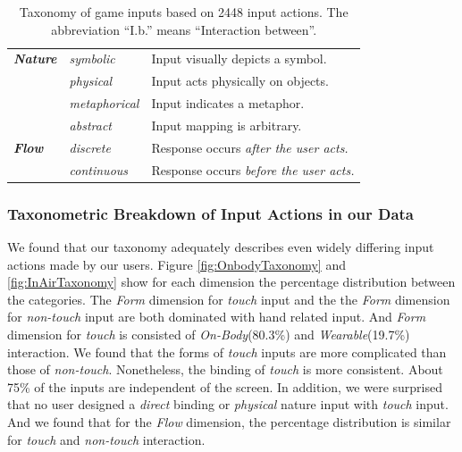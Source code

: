 \documentclass{sigchi}
\begin{document}
\begin{table}
\begin{adjustwidth}{-0.5cm}{}
\begin{tabular}{|l|l|l|}
        \textbf{\em{Nature}} & \em{symbolic} & Input visually depicts a symbol.\\ \cline{2-3} 
             & \em{physical} & Input acts physically on objects.\\ \cline{2-3} 
             & \em{metaphorical} & Input indicates a metaphor.\\ \cline{2-3} 
             & \em{abstract} & Input mapping is arbitrary.\\
      \Xhline{4\arrayrulewidth}
        \textbf{\em{Flow}} & \em{discrete} & Response occurs \em{after} the user acts.\\ \cline{2-3} 
             & \em{continuous} & Response occurs \em{before} the user acts.\\
      \hline
    \end{tabular}
    \caption{Taxonomy of game inputs based on 2448 input actions. The abbreviation ``I.b.'' means ``Interaction between''.}
    \label{tab:taxonomy}
    \end{adjustwidth}
  \end{table}
 

 \subsubsection{Taxonometric Breakdown of Input Actions in our Data}
We found that our taxonomy adequately describes even widely differing input actions made by our users. Figure \ref{fig:OnbodyTaxonomy} and \ref{fig:InAirTaxonomy} show for each dimension the percentage distribution between the categories. The \emph{Form} dimension for \emph{touch} input and the the \emph{Form} dimension for \emph{non-touch} input are both dominated with hand related input. And \emph{Form} dimension for \emph{touch} is consisted of \emph{On-Body}(80.3\%) and \emph{Wearable}(19.7\%) interaction. We found that the forms of \emph{touch} inputs are more complicated than those of \emph{non-touch}. Nonetheless, the binding of \emph{touch} is more consistent. About 75\% of the inputs are independent of the screen. In addition, we were surprised that no user designed a \emph{direct} binding or \emph{physical} nature input with \emph{touch} input. And we found that for the \emph{Flow} dimension, the percentage distribution is similar for \emph{touch} and \emph{non-touch} interaction.
\end{document}
